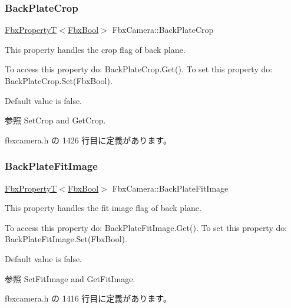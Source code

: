 \mbox{\label{class_fbx_camera_a3ec93b32631cf0b3bd2f41878c47a348}} 
\subsubsection{\texorpdfstring{Back\+Plate\+Crop}{BackPlateCrop}}
{\footnotesize\ttfamily \hyperlink{class_fbx_property_t}{Fbx\+PropertyT}$<$\hyperlink{fbxtypes_8h_a92e0562b2fe33e76a242f498b362262e}{Fbx\+Bool}$>$ Fbx\+Camera\+::\+Back\+Plate\+Crop}

This property handles the crop flag of back plane.

To access this property do\+: Back\+Plate\+Crop.\+Get(). To set this property do\+: Back\+Plate\+Crop.\+Set(\+Fbx\+Bool).

Default value is false. \begin{DoxySeeAlso}{参照}
Set\+Crop and Get\+Crop. 
\end{DoxySeeAlso}


 fbxcamera.\+h の 1426 行目に定義があります。

\mbox{\label{class_fbx_camera_a60226ecc8df67faa201c77434eccd486}} 
\subsubsection{\texorpdfstring{Back\+Plate\+Fit\+Image}{BackPlateFitImage}}
{\footnotesize\ttfamily \hyperlink{class_fbx_property_t}{Fbx\+PropertyT}$<$\hyperlink{fbxtypes_8h_a92e0562b2fe33e76a242f498b362262e}{Fbx\+Bool}$>$ Fbx\+Camera\+::\+Back\+Plate\+Fit\+Image}

This property handles the fit image flag of back plane.

To access this property do\+: Back\+Plate\+Fit\+Image.\+Get(). To set this property do\+: Back\+Plate\+Fit\+Image.\+Set(\+Fbx\+Bool).

Default value is false. \begin{DoxySeeAlso}{参照}
Set\+Fit\+Image and Get\+Fit\+Image. 
\end{DoxySeeAlso}


 fbxcamera.\+h の 1416 行目に定義があります。


